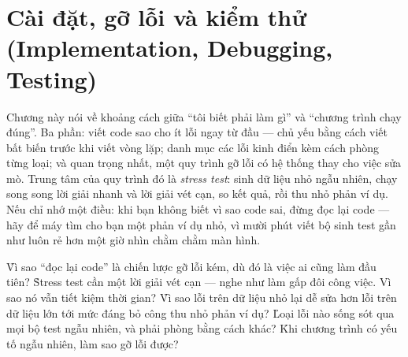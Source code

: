 \documentclass[../../algorithm.tex]{subfiles}
\begin{document}
\chapter{Cài đặt, gỡ lỗi và kiểm thử (Implementation, Debugging, Testing)}

\begin{tomtat}
Chương này nói về khoảng cách giữa ``tôi biết phải làm gì'' và ``chương trình chạy đúng''. Ba phần: viết code sao cho ít lỗi ngay từ đầu --- chủ yếu bằng cách viết bất biến trước khi viết vòng lặp; danh mục các lỗi kinh điển kèm cách phòng từng loại; và quan trọng nhất, một quy trình gỡ lỗi có hệ thống thay cho việc sửa mò. Trung tâm của quy trình đó là \emph{stress test}: sinh dữ liệu nhỏ ngẫu nhiên, chạy song song lời giải nhanh và lời giải vét cạn, so kết quả, rồi thu nhỏ phản ví dụ. Nếu chỉ nhớ một điều: khi bạn không biết vì sao code sai, đừng đọc lại code --- hãy để máy tìm cho bạn một phản ví dụ nhỏ, vì mười phút viết bộ sinh test gần như luôn rẻ hơn một giờ nhìn chằm chằm màn hình.
\end{tomtat}

\begin{nentang}
\end{nentang}

\begin{khoigoi}
\h{Vì sao ``đọc lại code'' là chiến lược gỡ lỗi kém, dù đó là việc ai cũng làm đầu tiên?}
\h{Stress test cần một lời giải vét cạn --- nghe như làm gấp đôi công việc. Vì sao nó vẫn tiết kiệm thời gian?}
\h{Vì sao lỗi trên dữ liệu nhỏ lại dễ sửa hơn lỗi trên dữ liệu lớn tới mức đáng bỏ công thu nhỏ phản ví dụ?}
\h{Loại lỗi nào sống sót qua mọi bộ test ngẫu nhiên, và phải phòng bằng cách khác?}
\h{Khi chương trình có yếu tố ngẫu nhiên, làm sao gỡ lỗi được?}
\end{khoigoi}
\end{document}
